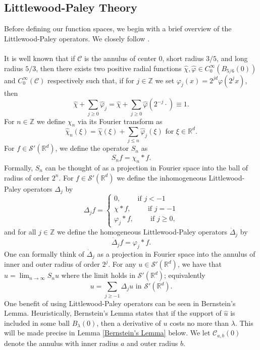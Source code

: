 \documentclass[12pt,xcolor=svgnames]{amsart}
\newcommand{\R}{\mathbb{R}}
\begin{document}
\subsection{Littlewood-Paley Theory}
Before defining our function spaces, we begin with a brief overview of the Littlewood-Paley operators. We closely follow \cite{3}.\\
\\
It is well known that if $\mathcal{C}$ is the annulus of center $0$, short radius $3/5$, and long radius $5/3$, then there exists two positive radial functions $\hat{\chi},\hat{\varphi} \in C_0^{\infty}(B_{5/6}(0))$ and $C_0^{\infty}(\mathcal{C})$ respectively such that, if for $j \in \mathbb{Z}$ we set $\varphi_j(x)=2^{jd}\varphi(2^jx)$, then
$$
\hat{\chi}+\sum_{j\geq 0} \hat{\varphi}_j = \hat{\chi} + \sum_{j \geq 0} \hat{\varphi}(2^{-j}\cdot)
 \equiv 1.$$
For $n \in \mathbb{Z}$ we define $\chi_n$ via its Fourier transform as
$$
\hat{\chi}_n(\xi) = \hat{\chi}(\xi) + \sum_{j \leq n} \hat{\varphi}_j(\xi) \text{ for } \xi \in \R^d.
$$
For  $f \in \mathcal{S}'(\R^d)$, we define the operator $S_n$ as 
$$
S_n f =\chi_n \ast f.
$$
Formally, $S_n$ can be thought of as a projection in Fourier space into the ball of radius of order $2^n$. For $f \in \mathcal{S}'(\R^d)$ we define the inhomogeneous Littlewood-Paley operators $\Delta_j$ by 
\begin{equation*}
\label{LP operator}
\Delta_j f
=
\begin{cases}
    0, \hspace{1cm} \text{if }j < -1\\
    \chi \ast f, \hspace{1cm} \text{if } j=-1 \\
    \varphi_j \ast f, \hspace{1cm} \text{if } j\geq 0,
\end{cases}
\end{equation*}
and for all $j\in \mathbb{Z}$ we define the homogeneous Littlewood-Paley operators $\dot{\Delta}_j$ by
$$
\dot{\Delta}_j f = \varphi_j \ast f.
$$
One can formally think of $\dot{\Delta}_j$ as a projection in Fourier space into the annulus of inner and outer radius of order $2^j$. For any $u \in \mathcal{S}'(\R^d)$, we have that $u = \lim_{n \to \infty} S_nu$ where the limit holds in $\mathcal{S}'(\R^d)$; equivalently
$$
u = \sum_{j\geq -1} \Delta_j u \text{ in } \mathcal{S}'(\R^d).
$$
One benefit of using Littlewood-Paley operators can be seen in Bernstein's Lemma. Heuristically, Bernstein's Lemma states that if the support of $\hat{u}$ is included in some ball $B_{\lambda}(0)$, then a derivative of $u$ costs no more than $\lambda$. This will be made precise in Lemma \ref{Bernstein's Lemma} below. We let $\mathcal{C}_{a,b}(0)$ denote the annulus with inner radius $a$ and outer radius $b$.
\end{document}
